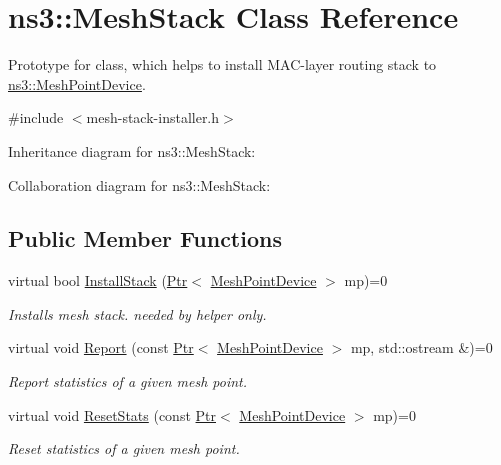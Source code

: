 \hypertarget{classns3_1_1MeshStack}{}\section{ns3\+:\+:Mesh\+Stack Class Reference}
\label{classns3_1_1MeshStack}


Prototype for class, which helps to install M\+A\+C-\/layer routing stack to \hyperlink{classns3_1_1MeshPointDevice}{ns3\+::\+Mesh\+Point\+Device}.  




{\ttfamily \#include $<$mesh-\/stack-\/installer.\+h$>$}



Inheritance diagram for ns3\+:\+:Mesh\+Stack\+:


Collaboration diagram for ns3\+:\+:Mesh\+Stack\+:
\subsection*{Public Member Functions}
\begin{DoxyCompactItemize}
\item 
virtual bool \hyperlink{classns3_1_1MeshStack_a7002a6c0a867eab5ddfe31a0f2c80caa}{Install\+Stack} (\hyperlink{classns3_1_1Ptr}{Ptr}$<$ \hyperlink{classns3_1_1MeshPointDevice}{Mesh\+Point\+Device} $>$ mp)=0
\begin{DoxyCompactList}\small\item\em Installs mesh stack. needed by helper only. \end{DoxyCompactList}\item 
virtual void \hyperlink{classns3_1_1MeshStack_a616cb6a499bb1a536fa92449a159c724}{Report} (const \hyperlink{classns3_1_1Ptr}{Ptr}$<$ \hyperlink{classns3_1_1MeshPointDevice}{Mesh\+Point\+Device} $>$ mp, std\+::ostream \&)=0
\begin{DoxyCompactList}\small\item\em Report statistics of a given mesh point. \end{DoxyCompactList}\item 
virtual void \hyperlink{classns3_1_1MeshStack_af694bf8e1ef6fba265d0b4ec8b09bbf4}{Reset\+Stats} (const \hyperlink{classns3_1_1Ptr}{Ptr}$<$ \hyperlink{classns3_1_1MeshPointDevice}{Mesh\+Point\+Device} $>$ mp)=0
\begin{DoxyCompactList}\small\item\em Reset statistics of a given mesh point. \end{DoxyCompactList}\end{DoxyCompactItemize}
